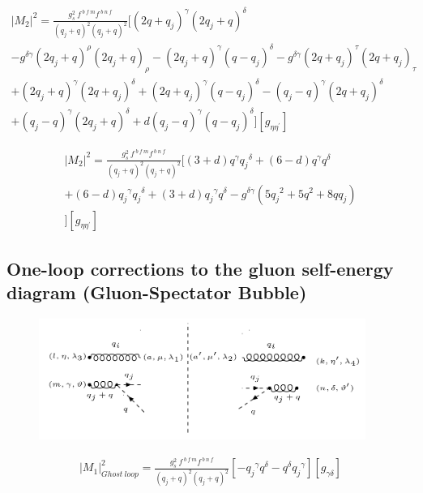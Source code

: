 \begin{equation}
\begin{split}
|M_2|^2=\frac{g_s^2\: f^{\:b\:f\:m} f^{\:b\:n\:f}}{(q_j +q)^2 (q_j +q)^2}[(2q+q_j)^{{\gamma}}(2q_j+q)^{\delta}\\
-g^{{\delta}{\gamma}}(2q_j+q)^{\rho}(2q_j +q)_{{\rho}}-(2q_j+q)^{\gamma}(q-q_j)^{{\delta}}-g^{{\delta}{\gamma}}(2q +q_j)^{\tau}(2q+q_j)_{{\tau}}\\
+(2q_j +q)^{{\gamma}}(2q +q_j)^{\delta}+(2q +q_j)^{\gamma}(q-q_j)^{{\delta}}-(q_j -q)^{\gamma}(2q+q_j)^{{\delta}}\\
+(q_j -q)^{\gamma}(2q_j +q)^{{\delta}}+d(q_j -q)^{\gamma}(q-q_j)^{{\delta}}][g_{{\eta}{{\eta}^{\prime}}}]
\end{split}
\end{equation}


\begin{equation}
\begin{split}
|M_2|^2=\frac{g_s^2\: f^{\:b\:f\:m} f^{\:b\:n\:f}}{(q_j +q)^2 (q_j +q)^2}[(3+d)q^{\gamma}{q_j}^{\delta}+(6-d)q^{\gamma}{q}^{\delta}\\+(6-d){q_j}^{\gamma}{q_j}^{\delta}+(3+d){q_j}^{\gamma}{q}^{\delta}-g^{{\delta}{\gamma}}(5{q_j}^2+5q^2+8qq_j)\\
][g_{{\eta}{{\eta}^{\prime}}}]
\end{split}
\end{equation}





\pagebreak
\subsection{One-loop corrections to the gluon self-energy diagram (Gluon-Spectator Bubble)}
\begin{figure}[h!]
\centering
\includegraphics[width=0.95\textwidth]{images/GG/GhostM2.png}
\end{figure}
\begin{equation}
\begin{split}
{{|M_1|}^2_{Ghost \:loop}}=\frac{g_s^2 \:f^{\:b\:f\:m} f^{\:b\:n\:f}}{(q_j +q)^2 (q_j +q)^2} [-{q_j}^{{\gamma}}{q}^{{\delta}}-{q}^{{\delta}}{q_j}^{{\gamma}}][g_{{\gamma}{\delta}}]
\end{split}
\end{equation}

